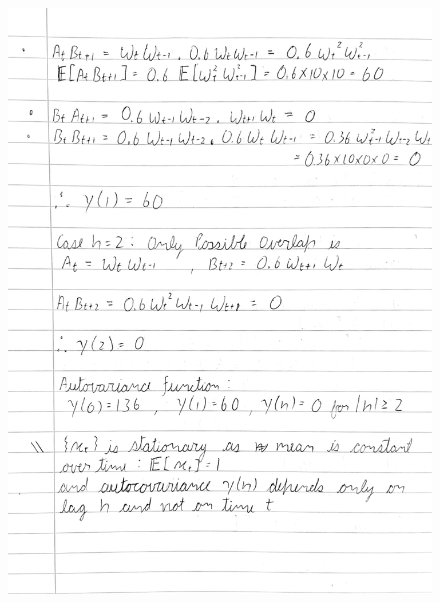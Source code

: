 \documentclass[a4paper,11pt]{article}
\begin{document}
    \begin{figure}[H]
        \centering
        \includegraphics[width=1\textwidth]{figure-markdown_strict/1-2.png}
        \label{fig:1-2}
    \end{figure}
\end{document}
